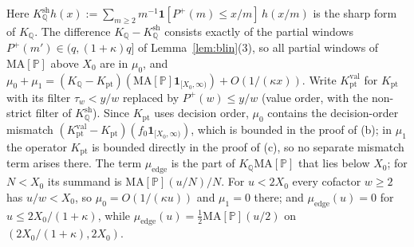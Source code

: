 Here $K^{\mathrm{sh}}_{\mathbb Q}h(x):=\sum_{m\ge2}m^{-1}\mathbf 1[P^+(m)\le x/m]\,h(x/m)$ is the sharp form of $K_{\mathbb Q}$. The
difference $K_{\mathbb Q}-K^{\mathrm{sh}}_{\mathbb Q}$ consists exactly of the partial windows $P^+(m')\in(q,(1+\kappa)q]$ of
Lemma~\ref{lem:blin}(3), so all partial windows of $\mathrm{MA}[\mathbb P]$ above $X_0$ are in $\mu_0$, and
$\mu_0+\mu_1=(K_{\mathbb Q}-K_{\mathrm{pt}})(\mathrm{MA}[\mathbb P]\mathbf 1_{[X_0,\infty)})+O(1/(\kappa x))$. Write
$K^{\mathrm{val}}_{\mathrm{pt}}$ for $K_{\mathrm{pt}}$ with its filter $\tau_w<y/w$ replaced by $P^+(w)\le y/w$ (value order, with the
non-strict filter of $K^{\mathrm{sh}}_{\mathbb Q}$). Since $K_{\mathrm{pt}}$ uses decision order, $\mu_0$ contains the decision-order mismatch
$(K^{\mathrm{val}}_{\mathrm{pt}}-K_{\mathrm{pt}})(f_0\mathbf 1_{[X_0,\infty)})$, which is bounded in the proof of (b); in $\mu_1$ the operator
$K_{\mathrm{pt}}$ is bounded directly in the proof of (c), so no separate mismatch term arises there. The term $\mu_{\mathrm{edge}}$ is the part of $K_{\mathbb Q}\mathrm{MA}[\mathbb P]$ that lies below $X_0$; for $N<X_0$ its summand is
$\mathrm{MA}[\mathbb P](u/N)/N$. For $u<2X_0$ every cofactor $w\ge2$ has $u/w<X_0$, so $\mu_0=O(1/(\kappa u))$ and $\mu_1=0$ there;
and $\mu_{\mathrm{edge}}(u)=0$ for $u\le2X_0/(1+\kappa)$, while $\mu_{\mathrm{edge}}(u)=\tfrac12\mathrm{MA}[\mathbb P](u/2)$ on
$(2X_0/(1+\kappa),2X_0)$.

